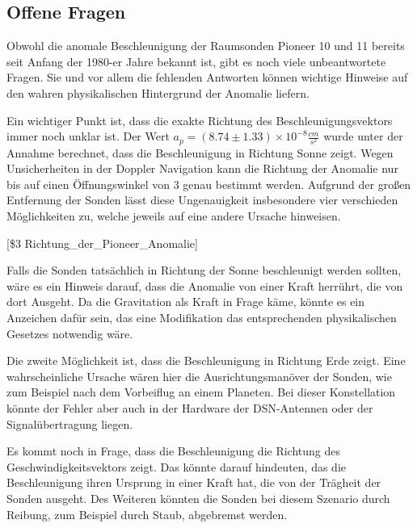
\subsection{Offene Fragen}

Obwohl die anomale Beschleunigung der Raumsonden Pioneer 10 und 11
bereits seit Anfang der 1980-er Jahre bekannt ist, gibt es noch viele
unbeantwortete Fragen\cite{Turyshev2010}. Sie und vor allem die fehlenden Antworten
k\"onnen wichtige Hinweise auf den wahren physikalischen Hintergrund
der Anomalie liefern.


\bigskip

Ein wichtiger Punkt ist, dass die exakte Richtung des
Beschleunigungsvektors immer noch unklar ist. Der Wert  $a_{p}=(8.74\pm
1.33)\times 10^{-8}\frac{\mathit{cm}}{s^{2}}$ wurde unter der Annahme
berechnet, dass die Beschleunigung in Richtung Sonne zeigt. Wegen
Unsicherheiten in der Doppler Navigation kann die Richtung der Anomalie
nur bis auf einen \"Offnungswinkel von 3{\textordmasculine} genau
bestimmt werden. Aufgrund der gro{\ss}en Entfernung der Sonden l\"asst
diese Ungenauigkeit insbesondere vier verschieden M\"oglichkeiten zu,
welche jeweils auf eine andere Ursache hinweisen.

[\$3 Richtung\_der\_Pioneer\_Anomalie]


\bigskip

Falls die Sonden tats\"achlich in Richtung der Sonne beschleunigt werden
sollten, w\"are es ein Hinweis darauf, dass die Anomalie von einer
Kraft herr\"uhrt, die von dort Ausgeht. Da die Gravitation als Kraft in
Frage k\"ame, k\"onnte es ein Anzeichen daf\"ur sein, das eine
Modifikation das entsprechenden physikalischen Gesetzes notwendig
w\"are.


\bigskip

Die zweite M\"oglichkeit ist, dass die Beschleunigung in Richtung Erde
zeigt. Eine wahrscheinliche Ursache w\"aren hier die
Ausrichtungsman\"over der Sonden, wie zum Beispiel nach dem Vorbeiflug
an einem Planeten. Bei dieser Konstellation k\"onnte der Fehler aber
auch in der Hardware der DSN-Antennen oder der Signal\"ubertragung
liegen.


\bigskip

Es kommt noch in Frage, dass die Beschleunigung die Richtung des
Geschwindigkeitsvektors zeigt. Das k\"onnte darauf hindeuten, das die
Beschleunigung ihren Ursprung in einer Kraft hat, die von der
Tr\"agheit der Sonden ausgeht. Des Weiteren k\"onnten die Sonden bei
diesem Szenario durch Reibung, zum Beispiel durch Staub, abgebremst
werden.


